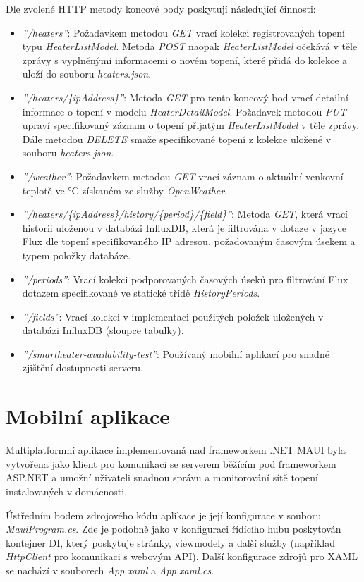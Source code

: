 \noindent Dle zvolené HTTP metody koncové body poskytují následující činnosti:
\begin{itemize}
    \item {\it ''/heaters''}: Požadavkem metodou {\it GET} vrací kolekci registrovaných topení typu {\it HeaterListModel}. Metoda {\it POST} naopak {\it HeaterListModel} očekává v těle zprávy s vyplněnými informacemi o novém topení, které přidá do kolekce a uloží do souboru {\it heaters.json}.
    \item {\it ''/heaters/\{ipAddress\}''}: Metoda {\it GET} pro tento koncový bod vrací detailní informace o topení v modelu {\it HeaterDetailModel}. Požadavek metodou {\it PUT} upraví specifikovaný záznam o topení přijatým {\it HeaterListModel} v těle zprávy. Dále metodou {\it DELETE} smaže specifikované topení z kolekce uložené v souboru {\it heaters.json}.
    \item {\it ''/weather''}: Požadavkem metodou {\it GET} vrací záznam o aktuální venkovní teplotě ve °C získaném ze služby {\it OpenWeather}.
    \item {\it ''/heaters/\{ipAddress\}/history/\{period\}/\{field\}''}: Metoda {\it GET}, která vrací historii uloženou v databázi InfluxDB, která je filtrována v dotaze v jazyce Flux dle topení specifikovaného IP adresou, požadovaným časovým úsekem a typem položky databáze.
    \item {\it ''/periods''}: Vrací kolekci podporovaných časových úseků pro filtrování Flux dotazem specifikované ve statické třídě {\it HistoryPeriods}.
    \item {\it ''/fields''}: Vrací kolekci v implementaci použitých položek uložených v databázi InfluxDB (sloupce tabulky). 
    \item {\it ''/smartheater-availability-test''}: Používaný mobilní aplikací pro snadné zjištění dostupnosti serveru.
\end{itemize}


\section{Mobilní aplikace}
Multiplatformní aplikace implementovaná nad frameworkem .NET MAUI byla vytvořena jako klient pro komunikaci se serverem běžícím pod frameworkem ASP.NET a umožní uživateli snadnou správu a monitorování sítě topení instalovaných v domácnosti.

Ústředním bodem zdrojového kódu aplikace je její konfigurace v souboru {\it MauiProgram.cs}. Zde je podobně jako v konfiguraci řídícího hubu poskytován kontejner DI, který poskytuje stránky, viewmodely a další služby (například {\it HttpClient} pro komunikaci s webovým API). Další konfigurace zdrojů pro XAML se nachází v souborech {\it App.xaml} a {\it App.xaml.cs}.

